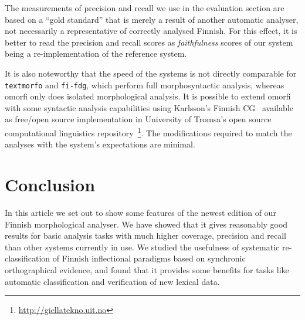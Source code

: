 \documentclass[a4paper,12pt]{article}
\begin{document}
The measurements of precision and recall we use in the evaluation section are
based on a ``gold standard'' that is merely a result of another automatic
analyser, not necessarily a representative of correctly analysed Finnish. For
this effect, it is better to read the precision and recall scores as 
\emph{faithfulness} scores of our system being a re-implementation of the
reference system.

It is also noteworthy that the speed of the systems is not directly comparable
for \texttt{textmorfo} and \texttt{fi-fdg}, which perform full morphosyntactic
analysis, whereas omorfi only does isolated morphological analysis. It is
possible to extend omorfi with some syntactic analysis capabilities using
Karlsson's Finnish CG~\cite{} available as free/open source implementation
in University of Tromsa's open source computational linguistics 
repository~\footnote{\url{http://giellatekno.uit.no}}. The modifications
required to match the analyses with the system's expectations are minimal.

\section{Conclusion}

In this article we set out to show some features of the newest edition of our
Finnish morphological analyser. We have showed that it gives reasonably good
results for basic analysis tasks with much higher coverage, precision and recall
than other systems currently in use. We studied the usefulness of systematic
re-classification of Finnish inflectional paradigms based on synchronic
orthographical evidence, and found that it provides some benefits for tasks
like automatic classification and verification of new lexical data.



\end{document}
